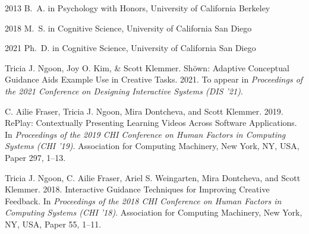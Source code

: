 \begin{vita}
  \item[2013] B.~A. in Psychology with Honors, University of California Berkeley
  \item[2018] M.~S. in Cognitive Science, University of California San Diego
  \item[2021] Ph.~D. in Cognitive Science, University of California San Diego
\end{vita}
\begin{publications}
  \item Tricia J. Ngoon, Joy O. Kim, \& Scott Klemmer. Sh\"{o}wn: Adaptive Conceptual Guidance Aids Example Use in Creative Tasks. 2021. To appear in \textit{Proceedings of the 2021 Conference on Designing Interactive Systems (DIS '21)}.
  \item C. Ailie Fraser, Tricia J. Ngoon, Mira Dontcheva, and Scott Klemmer. 2019. RePlay: Contextually Presenting Learning Videos Across Software Applications. In \textit{Proceedings of the 2019 CHI Conference on Human Factors in Computing Systems (CHI '19)}. Association for Computing Machinery, New York, NY, USA, Paper 297, 1–13.
  \item Tricia J. Ngoon, C. Ailie Fraser, Ariel S. Weingarten, Mira Dontcheva, and Scott Klemmer. 2018. Interactive Guidance Techniques for Improving Creative Feedback. In \textit{Proceedings of the 2018 CHI Conference on Human Factors in Computing Systems (CHI '18)}. Association for Computing Machinery, New York, NY, USA, Paper 55, 1–11.
\end{publications}